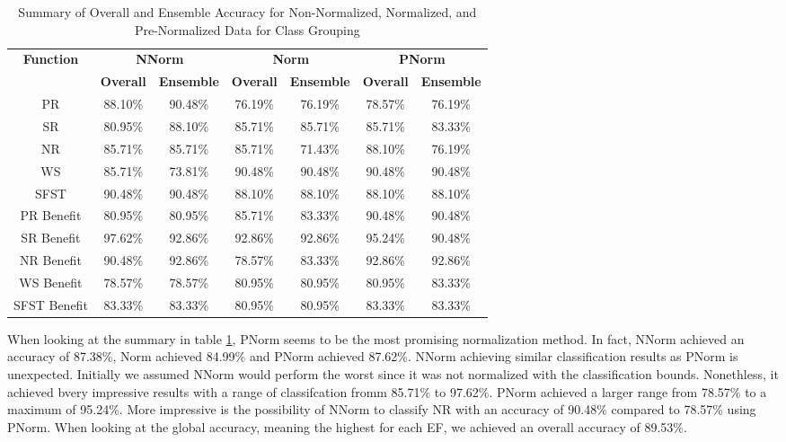 \documentclass[12pt,letterpaper]{article}
\begin{document}
\begin{table}[H]
\centering
\begin{tabular}{|c||c|c||c|c||c|c|}
\hline
\multirow{2}{*}{\textbf{Function}} & \multicolumn{2}{c||}{\textbf{NNorm}} & \multicolumn{2}{c||}{\textbf{Norm}} & \multicolumn{2}{c|}{\textbf{PNorm}} \\
\cline{2-7}
 & \textbf{Overall} & \textbf{Ensemble} & \textbf{Overall} & \textbf{Ensemble} & \textbf{Overall} & \textbf{Ensemble} \\
\hline
PR & 88.10\% & 90.48\% & 76.19\% & 76.19\% & 78.57\% & 76.19\% \\
\hline
SR & 80.95\% & 88.10\% & 85.71\% & 85.71\% & 85.71\% & 83.33\% \\
\hline
NR & 85.71\% & 85.71\% & 85.71\% & 71.43\% & 88.10\% & 76.19\% \\
\hline
WS & 85.71\% & 73.81\% & 90.48\% & 90.48\% & 90.48\% & 90.48\% \\
\hline
SFST & 90.48\% & 90.48\% & 88.10\% & 88.10\% & 88.10\% & 88.10\% \\
\hline

PR Benefit & 80.95\% & 80.95\% & 85.71\% & 83.33\% & 90.48\% & 90.48\% \\
\hline
SR Benefit & 97.62\% & 92.86\% & 92.86\% & 92.86\% & 95.24\% & 90.48\% \\
\hline
NR Benefit & 90.48\% & 92.86\% & 78.57\% & 83.33\% & 92.86\% & 92.86\% \\
\hline
WS Benefit & 78.57\% & 78.57\% & 80.95\% & 80.95\% & 80.95\% & 83.33\% \\
\hline
SFST Benefit & 83.33\% & 83.33\% & 80.95\% & 80.95\% & 83.33\% & 83.33\% \\
\hline
\end{tabular}
\caption{Summary of Overall and Ensemble Accuracy for Non-Normalized, Normalized, and Pre-Normalized Data for Class Grouping}
\label{reg_all_tab:summary_grouping}
\end{table}



When looking at the summary in table \ref{reg_all_tab:summary_grouping}, PNorm seems to be the most promising normalization method.
In fact, NNorm achieved an accuracy of 87.38\%, Norm achieved 84.99\% and PNorm achieved 87.62\%.
NNorm achieving similar classification results as PNorm is unexpected.
Initially we assumed NNorm would perform the worst since it was not normalized with the classification bounds.
Nonethless, it achieved bvery impressive results with a range of classifcation fromm 85.71\% to 97.62\%.
PNorm achieved a larger range from 78.57\% to a maximum of 95.24\%.
More impressive is the possibility of NNorm to classify \ac{NR} with an accuracy of 90.48\% compared to 78.57\% using PNorm.
When looking at the global accuracy, meaning the highest for each \ac{EF}, we achieved an overall accuracy of 89.53\%.
\end{document}
